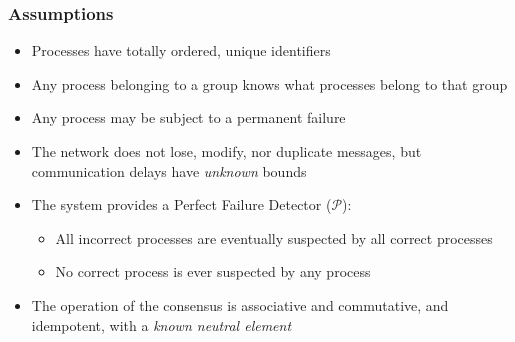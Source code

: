 \begin{frame}
  \frametitle{Assumptions}
  
  \begin{itemize}
  \item Processes have totally ordered, \textcolor{red!75}{unique identifiers}
  \item Any process belonging to a group knows
    \textcolor{blue!75}{what processes belong to that group}
  \item Any process may be subject to a \textcolor{red!75}{permanent failure}
  \item The network does not \textcolor{blue!50!black}{lose},
    \textcolor{red!50!black}{modify}, nor
    \textcolor{green!50!black}{duplicate} messages, but communication
    delays \textcolor{red!75}{have \emph{unknown} bounds}
  \item The system provides a \textcolor{red!50!black}{Perfect Failure
      Detector} (${\mathcal P}$):
    \begin{itemize}
    \item All \textcolor{red!50!black}{incorrect} processes are eventually suspected by all
      \textcolor{green!50!black}{correct} processes
    \item No \textcolor{green!50!black}{correct} process is ever suspected by any process
    \end{itemize}
  \item The operation of the consensus is associative and commutative,
    and idempotent, with a \emph{known neutral element}
  \end{itemize}

\end{frame}


